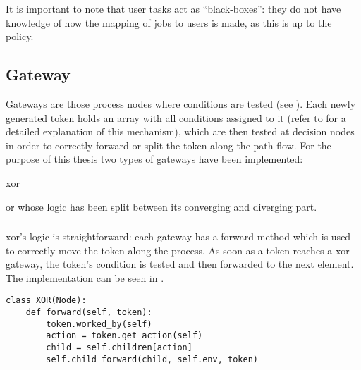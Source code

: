 It is important to note that user tasks act as ``black-boxes'': they do not have knowledge of how the mapping of jobs to users is made, as this is up to the policy.

\subsection{Gateway}

Gateways are those process nodes where conditions are tested (see ). Each newly generated token holds an array with all conditions assigned to it (refer to  for a detailed explanation of this mechanism), which are then tested at decision nodes in order to correctly forward or split the token along the path flow. For the purpose of this thesis two types of gateways have been implemented:
\begin{enumerate*}
     \item \gls{xor}
     \item \gls{or} whose logic has been split between its converging and diverging part.
 \end{enumerate*} 

\subsubsection{}

\gls{xor}'s logic is straightforward: each gateway has a forward method which is used to correctly move the token along the process. As soon as a token reaches a \gls{xor} gateway, the token's condition is tested and then forwarded to the next element. The implementation can be seen in . 

\begin{lstlisting}[caption=\glsentryshort{xor}'s forward method in which the to be forwarded to node is retrieved from the token path by looking for the corresponding value with the node id. Eventually a call to the \glsentryshort{xor}'s forward method is made.,label=lst:xor_forward,style=CustomPython]
class XOR(Node):
    def forward(self, token):
        token.worked_by(self)
        action = token.get_action(self)
        child = self.children[action]
        self.child_forward(child, self.env, token)
\end{lstlisting}

\subsubsection{}

